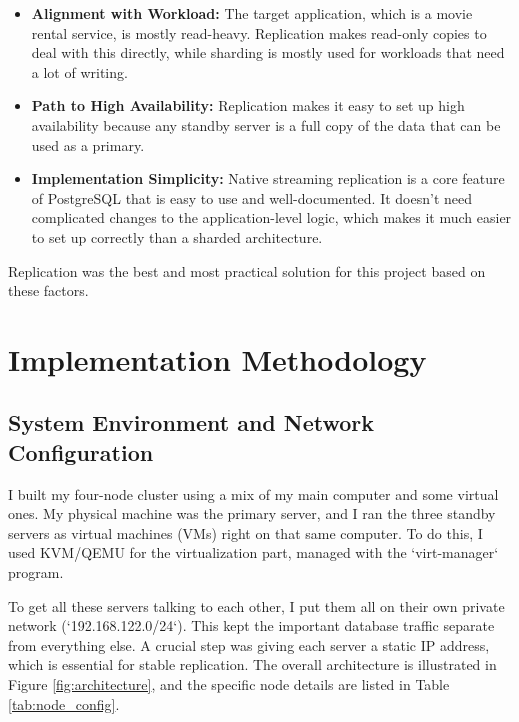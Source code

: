 \documentclass[conference]{IEEEtran}
\begin{document}
\begin{itemize}
    \item \textbf{Alignment with Workload:} The target application, which is a movie rental service, is mostly read-heavy. Replication makes read-only copies to deal with this directly, while sharding is mostly used for workloads that need a lot of writing.

    \item \textbf{Path to High Availability:} Replication makes it easy to set up high availability because any standby server is a full copy of the data that can be used as a primary.
    \item \textbf{Implementation Simplicity:} Native streaming replication is a core feature of PostgreSQL that is easy to use and well-documented. It doesn't need complicated changes to the application-level logic, which makes it much easier to set up correctly than a sharded architecture.
\end{itemize}

Replication was the best and most practical solution for this project based on these factors. 


\section{Implementation Methodology}

\subsection{System Environment and Network Configuration}

I built my four-node cluster using a mix of my main computer and some virtual ones. My physical machine was the primary server, and I ran the three standby servers as virtual machines (VMs) right on that same computer. To do this, I used KVM/QEMU for the virtualization part, managed with the `virt-manager` program.

To get all these servers talking to each other, I put them all on their own private network (`192.168.122.0/24`). This kept the important database traffic separate from everything else. A crucial step was giving each server a static IP address, which is essential for stable replication. The overall architecture is illustrated in Figure \ref{fig:architecture}, and the specific node details are listed in Table \ref{tab:node_config}.
\end{document}
